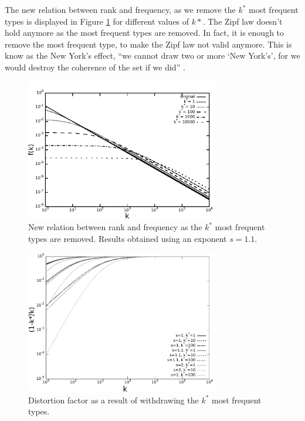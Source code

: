 The new relation between rank and frequency, as we remove the $k^\ast$ most frequent
types is displayed in Figure \ref{fig:newrelarion_s1_1} for different values of
$k\ast$. The Zipf law doesn't hold anymore as the most frequent types are removed.
In fact, it is enough to remove the most frequent type, to make the Zipf law not 
valid anymore. This is know as the New York's effect, ``we cannot draw two or more 
`New York’s', for we would destroy the coherence of the set if we did'' \citep{cristelli2012}.


\begin{figure}[htbp]
\centering
\includegraphics[width=0.75\textwidth]{images/newrelarion_s1_1.pdf}
\caption{New relation between rank and frequency as the $k^\ast$ most frequent types are removed. Results obtained using an exponent $s=1.1$.}
\label{fig:newrelarion_s1_1}
\end{figure}

\begin{figure}[htbp]
\centering
\includegraphics[width=0.75\textwidth]{images/zipf_distortion_factor.pdf}
\caption{Distortion factor as a result of withdrawing the $k^\ast$ most frequent types.}
\label{fig:zipf_distortion_factor}
\end{figure}


